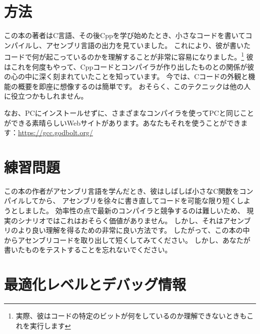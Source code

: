 \section{方法}

この本の著者はC言語、その後Cppを学び始めたとき、小さなコードを書いてコンパイルし、アセンブリ言語の出力を見ていました。 これにより、彼が書いたコードで何が起こっているのかを理解することが非常に容易になりました。\footnote{実際、彼はコードの特定のビットが何をしているのか理解できないときもこれを実行します}
彼はこれを何度もやって、Cppコードとコンパイラが作り出したものとの関係が彼の心の中に深く刻まれていたことを知っています。 今では、Cコードの外観と機能の概要を即座に想像するのは簡単です。 おそらく、このテクニックは他の人に役立つかもしれません。


なお、PCにインストールせずに、さまざまなコンパイラを使ってPCと同じことができる素晴らしいWebサイトがあります。あなたもそれを使うことができます：\url{https://gcc.godbolt.org/}

\section*{練習問題}

この本の作者がアセンブリ言語を学んだとき、彼はしばしば小さなC関数をコンパイルしてから、
アセンブリを徐々に書き直してコードを可能な限り短くしようとしました。 効率性の点で最新のコンパイラと競争するのは難しいため、
現実のシナリオではこれはおそらく価値がありません。 しかし、それはアセンブリのより良い理解を得るための非常に良い方法です。 
したがって、この本の中からアセンブリコードを取り出して短くしてみてください。 
しかし、あなたが書いたものをテストすることを忘れないでください。

\section*{最適化レベルとデバッグ情報}

